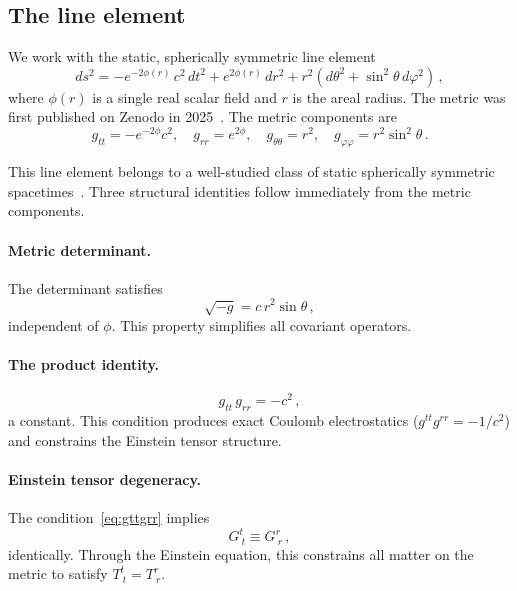 \documentclass[aps,prd,twocolumn,superscriptaddress,nofootinbib,longbibliography]{revtex4-2}
\begin{document}
\subsection{The line element}

We work with the static, spherically symmetric line element
\begin{equation}\label{eq:metric}
  ds^2 = -e^{-2\phi(r)}\,c^2\,dt^2 + e^{2\phi(r)}\,dr^2
         + r^2(d\theta^2 + \sin^2\!\theta\,d\varphi^2)\,,
\end{equation}
where $\phi(r)$ is a single real scalar field and $r$ is the areal
radius.  The metric was first published on Zenodo in
2025~\cite{zenodo2025}.  The metric components are
\begin{equation}
  g_{tt} = -e^{-2\phi}c^2,\quad g_{rr} = e^{2\phi},\quad
  g_{\theta\theta} = r^2,\quad g_{\varphi\varphi} = r^2\sin^2\theta\,.
\end{equation}

This line element belongs to a well-studied class of static
spherically symmetric spacetimes~\cite{Schwarzschild1916}.  Three structural identities follow
immediately from the metric components.

\paragraph{Metric determinant.}
The determinant satisfies
\begin{equation}\label{eq:detg}
  \sqrt{-g} = c\,r^2\sin\theta\,,
\end{equation}
independent of $\phi$.  This property simplifies all covariant
operators.

\paragraph{The product identity.}
\begin{equation}\label{eq:gttgrr}
  g_{tt}\,g_{rr} = -c^2\,,
\end{equation}
a constant.  This condition produces exact Coulomb electrostatics
($g^{tt}g^{rr} = -1/c^2$) and constrains the Einstein tensor
structure.

\paragraph{Einstein tensor degeneracy.}
The condition~\eqref{eq:gttgrr} implies
\begin{equation}\label{eq:gtgr}
  G^t_{\ t} \equiv G^r_{\ r}\,,
\end{equation}
identically.  Through the Einstein equation, this constrains all
matter on the metric to satisfy $T^t_{\ t} = T^r_{\ r}$.
\end{document}
